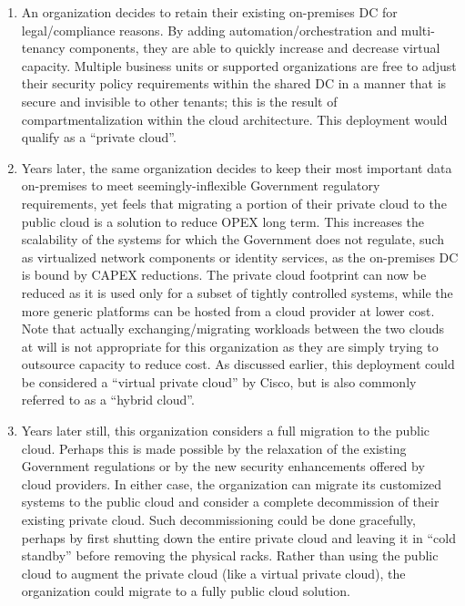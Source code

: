 \begin{enumerate}
  \item An organization decides to retain their existing on-premises DC for
  legal/compliance reasons. By adding automation/orchestration and
  multi-tenancy components, they are able to quickly increase and decrease
  virtual capacity. Multiple business units or supported organizations are
  free to adjust their security policy requirements within the shared DC in a
  manner that is secure and invisible to other tenants; this is the result of
  compartmentalization within the cloud architecture. This deployment would
  qualify as a ``private cloud''.

  \item Years later, the same organization decides to keep their most
  important data on-premises to meet seemingly-inflexible Government
  regulatory requirements, yet feels that migrating a portion of their private
  cloud to the public cloud is a solution to reduce OPEX long term. This increases
  the scalability of the systems for which the Government does not regulate,
  such as virtualized network components or identity services, as the
  on-premises DC is bound by CAPEX reductions. The private cloud footprint can
  now be reduced as it is used only for a subset of tightly controlled
  systems, while the more generic platforms can be hosted from a cloud
  provider at lower cost. Note that actually exchanging/migrating workloads
  between the two clouds at will is not appropriate for this organization as
  they are simply trying to outsource capacity to reduce cost. As discussed
  earlier, this deployment could be considered a ``virtual private cloud'' by
  Cisco, but is also commonly referred to as a ``hybrid cloud''.

  \item Years later still, this organization considers a full migration to the
  public cloud. Perhaps this is made possible by the relaxation of the
  existing Government regulations or by the new security enhancements offered
  by cloud providers. In either case, the organization can migrate its
  customized systems to the public cloud and consider a complete decommission
  of their existing private cloud. Such decommissioning could be done
  gracefully, perhaps by first shutting down the entire private cloud and
  leaving it in ``cold standby'' before removing the physical racks. Rather than
  using the public cloud to augment the private cloud (like a virtual private
  cloud), the organization could migrate to a fully public cloud solution.
\end{enumerate}

